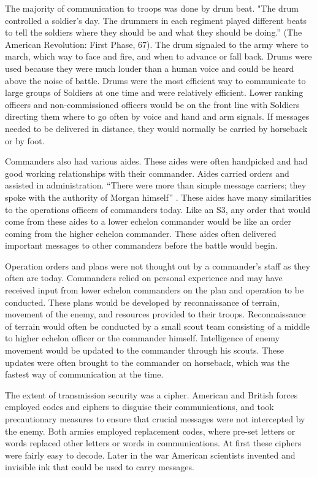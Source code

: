 The majority of communication to troops was done by drum beat.  "The drum
controlled a soldier’s day.  The drummers in each regiment played different
beats to tell the soldiers where they should be and what they should be doing.”
(The American Revolution: First Phase, 67).  The drum signaled to the army where
to march, which way to face and fire, and when to advance or fall back.  Drums
were used because they were much louder than a human voice and could be heard
above the noise of battle.  Drums were the most efficient way to communicate to
large groups of Soldiers at one time and were relatively efficient.  Lower
ranking officers and non-commissioned officers would be on the front line with
Soldiers directing them where to go often by voice and hand and arm signals.  If
messages needed to be delivered in distance, they would normally be carried by
horseback or by foot.     

 Commanders also had various aides.  These aides were often handpicked and had
good working relationships with their commander.  Aides carried orders and
assisted in administration.  “There were more than simple message carriers; they
spoke with the authority of Morgan himself” \cite[24-25]{babits_devil_2001}.  These aides
have many similarities to the operations officers of commanders today.  Like an
S3, any order that would come from these aides to a lower echelon commander
would be like an order coming from the higher echelon commander.  These aides
often delivered important messages to other commanders before the battle would
begin.

Operation orders and plans were not thought out by a commander’s staff as they
often are today.  Commanders relied on personal experience and may have received
input from lower echelon commanders on the plan and operation to be conducted.
These plans would be developed by reconnaissance of terrain, movement of the
enemy, and resources provided to their troops.  Reconnaissance of terrain would
often be conducted by a small scout team consisting of a middle to higher
echelon officer or the commander himself.  Intelligence of enemy movement would
be updated to the commander through his scouts.  These updates were often
brought to the commander on horseback, which was the fastest way of
communication at the time.

The extent of transmission security was a cipher.  American and British forces
employed codes and ciphers to disguise their communications, and took
precautionary measures to ensure that crucial messages were not intercepted by
the enemy. Both armies employed replacement codes, where pre-set letters or
words replaced other letters or words in communications.  At first these ciphers
were fairly easy to decode.  Later in the war American scientists invented and
invisible ink that could be used to carry messages.    

